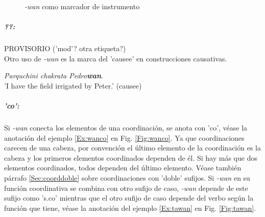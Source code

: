 \documentclass[a4paper,11pt,DIV12]{scrartcl}
\begin{document}
\begin{figure}
 \begin{center}
\caption{{\em -wan} como marcador de instrumento }\label{Fig:waninstr}
 \end{center}
\end{figure}

\subparagraph{??:}
PROVISORIO ('mod'? otra etiqueta?)\\
Otro uso de {\em -wan} es la marca del 'causee' en construcciones causativas.
\begin{examples}
 \item {\em Parquchini chakrata Pedro\textbf{wan}}.\\
     'I have the field irrigated by Peter.' (causee)\\
  	\hfill{\small \citep[216]{Adelaar04}}
\end{examples}

\subparagraph{'co':} Si {\em -wan} conecta los elementos de una coordinaci\'on, se anota con 'co', v\'ease la anotaci\'on del ejemplo \ref{Ex:wanco} en Fig. \ref{Fig:wanco}. Ya que coordinaciones carecen de una cabeza, por convenci\'on el \'ultimo elemento de la coordinaci\'on es la cabeza y los primeros elementos coordinados dependen de \'el. Si hay m\'as que dos elementos coordinados, todos dependen del \'ultimo elemento. V\'ease tambi\'en p\'arrafo \ref{Sec:coorddoble} sobre coordinaciones con 'doble' sufijos. Si {\em -wan} en su funci\'on coordinativa se combina con otro sufijo de caso, {\em -wan} depende de este sufijo como 's.co' mientras que el otro sufijo de caso depende del verbo seg\'un la funci\'on que tiene, v\'ease la anotaci\'on del ejemplo \ref{Ex:tawan} en Fig. \ref{Fig:tawan}.
\end{document}
